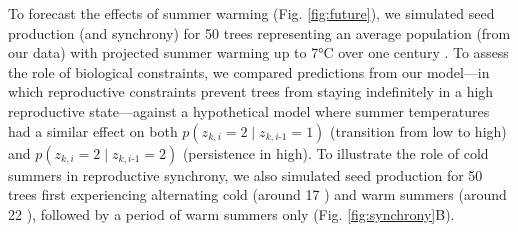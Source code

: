 \documentclass[11pt]{article}
\begin{document}
To forecast the effects of summer warming (Fig. \ref{fig:future}), we simulated seed production (and synchrony) for 50 trees representing an average population (from our data) with projected summer warming up to 7°C over one century \citep{Schumacher2024}. To assess the role of biological constraints, we compared predictions from our model---in which reproductive constraints prevent trees from staying indefinitely in a high reproductive state---against a hypothetical model where summer temperatures had a similar effect on both $p(z_{k,i} = 2 \mid z_{k,i\text{-}1} = 1)$ (transition from low to high) and $p(z_{k,i} = 2 \mid z_{k,i\text{-}1} = 2)$ (persistence in high). To illustrate the role of cold summers in reproductive synchrony, we also simulated seed production for 50 trees first experiencing alternating cold (around 17 \celsius) and warm summers (around 22 \celsius), followed by a period of warm summers only (Fig. \ref{fig:synchrony}B). %


\end{document}
